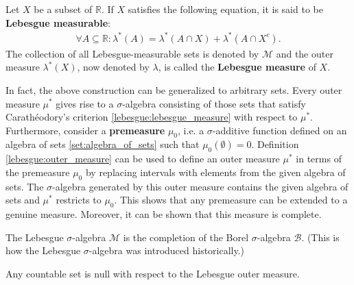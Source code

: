     \begin{theorem}\label{lebesgue:lebesgue_measure}
        Let $X$ be a subset of $\mathbb{R}$. If $X$ satisfies the following equation, it is said to be \textbf{Lebesgue measurable}:
        \begin{gather}
            \forall A\subseteq\mathbb{R}:\lambda^*(A) = \lambda^*(A\cap X) + \lambda^*(A\cap X^c).
        \end{gather}
        The collection of all Lebesgue-measurable sets is denoted by $\mathcal{M}$ and the outer measure $\lambda^*(X)$, now denoted by $\lambda$, is called the \textbf{Lebesgue measure} of $X$.
    \end{theorem}
    \begin{construct}\label{lebesgue:caratheodory}
        In fact, the above construction can be generalized to arbitrary sets. Every outer measure $\mu^*$ gives rise to a $\sigma$-algebra consisting of those sets that satisfy Carath\'eodory's criterion \ref{lebesgue:lebesgue_measure} with respect to $\mu^*$. Furthermore, consider a \textbf{premeasure} $\mu_0$, i.e. a $\sigma$-additive function defined on an algebra of sets \ref{set:algebra_of_sets} such that $\mu_0(\emptyset) = 0$. Definition \ref{lebesgue:outer_measure} can be used to define an outer measure $\mu^*$ in terms of the premeasure $\mu_0$ by replacing intervals with elements from the given algebra of sets. The $\sigma$-algebra generated by this outer measure contains the given algebra of sets and $\mu^*$ restricts to $\mu_0$. This shows that any premeasure can be extended to a genuine measure. Moreover, it can be shown that this measure is complete.
    \end{construct}
    \begin{result}\label{lebesgue:completion_remark}
        The Lebesgue $\sigma$-algebra $\mathcal{M}$ is the completion of the Borel $\sigma$-algebra $\mathcal{B}$. (This is how the Lebesgue $\sigma$-algebra was introduced historically.)
    \end{result}

    \begin{property}\label{lebesgue:countable_set_is_null}
        Any countable set is null with respect to the Lebesgue outer measure.
    \end{property}


